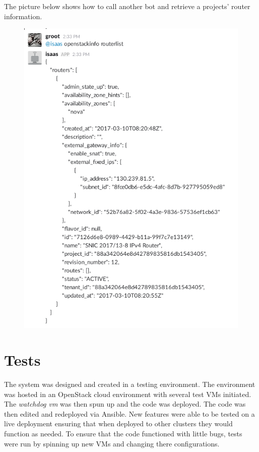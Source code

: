 \documentclass[12pt]{article}
\begin{document}
\newpage
The picture below shows how to call another bot and retrieve a projects' router information.
\begin{figure}[H]
    \begin{mdframed}
    \includegraphics[scale=.5]{./pic/2017-06-26-113808_563x789_scrot.png}
    \end{mdframed}
\end{figure}

\section{Tests}
The system was designed and created in a testing environment. The environment was hosted in an OpenStack cloud environment with several test VMs initiated. The \emph{watchdog vm} was then spun up and the code was deployed. The code was then edited and redeployed via Ansible. New features were able to be tested on a live deployment ensuring that when deployed to other clusters they would function as needed. To ensure that the code functioned with little bugs, tests were run by spinning up new VMs and changing there configurations.
\end{document}
